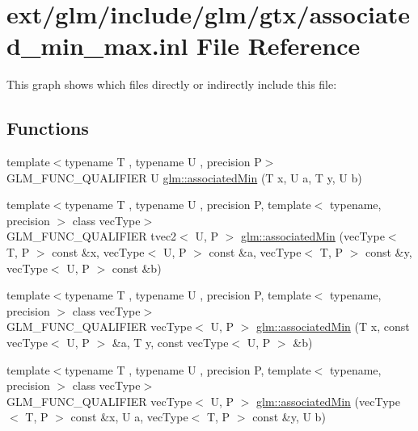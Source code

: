\hypertarget{associated__min__max_8inl}{\section{ext/glm/include/glm/gtx/associated\-\_\-min\-\_\-max.inl File Reference}
\label{associated__min__max_8inl}
}
This graph shows which files directly or indirectly include this file\-:
\subsection*{Functions}
\begin{DoxyCompactItemize}
\item 
{\footnotesize template$<$typename T , typename U , precision P$>$ }\\G\-L\-M\-\_\-\-F\-U\-N\-C\-\_\-\-Q\-U\-A\-L\-I\-F\-I\-E\-R U \hyperlink{group__gtx__associated__min__max_gacc01bd272359572fc28437ae214a02df}{glm\-::associated\-Min} (T x, U a, T y, U b)
\item 
{\footnotesize template$<$typename T , typename U , precision P, template$<$ typename, precision $>$ class vec\-Type$>$ }\\G\-L\-M\-\_\-\-F\-U\-N\-C\-\_\-\-Q\-U\-A\-L\-I\-F\-I\-E\-R tvec2$<$ U, P $>$ \hyperlink{group__gtx__associated__min__max_ga8b538d10872626668a078e2bd495af25}{glm\-::associated\-Min} (vec\-Type$<$ T, P $>$ const \&x, vec\-Type$<$ U, P $>$ const \&a, vec\-Type$<$ T, P $>$ const \&y, vec\-Type$<$ U, P $>$ const \&b)
\item 
{\footnotesize template$<$typename T , typename U , precision P, template$<$ typename, precision $>$ class vec\-Type$>$ }\\G\-L\-M\-\_\-\-F\-U\-N\-C\-\_\-\-Q\-U\-A\-L\-I\-F\-I\-E\-R vec\-Type$<$ U, P $>$ \hyperlink{group__gtx__associated__min__max_ga1dccff48fa5650c746533de83467da6e}{glm\-::associated\-Min} (T x, const vec\-Type$<$ U, P $>$ \&a, T y, const vec\-Type$<$ U, P $>$ \&b)
\item 
{\footnotesize template$<$typename T , typename U , precision P, template$<$ typename, precision $>$ class vec\-Type$>$ }\\G\-L\-M\-\_\-\-F\-U\-N\-C\-\_\-\-Q\-U\-A\-L\-I\-F\-I\-E\-R vec\-Type$<$ U, P $>$ \hyperlink{group__gtx__associated__min__max_ga076717f4e07c6ae725cc1382d1ac4869}{glm\-::associated\-Min} (vec\-Type$<$ T, P $>$ const \&x, U a, vec\-Type$<$ T, P $>$ const \&y, U b)
\item 

\end{DoxyCompactItemize}
